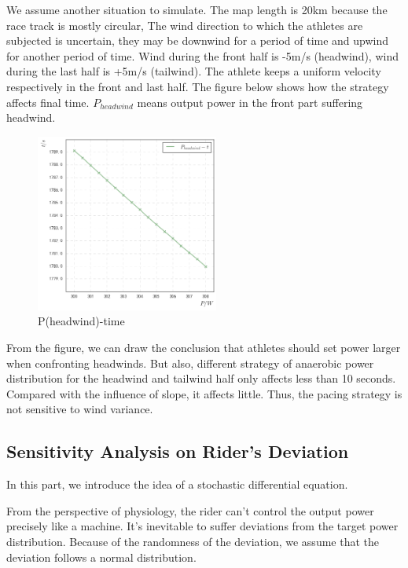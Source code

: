 \documentclass{mcmthesis}
\begin{document}
We assume another situation to simulate.
The map length is 20km because the race track is mostly circular, The wind direction to which the athletes are subjected is uncertain, they may be downwind for a period of time and upwind for another period of time. Wind during the front half is -5m/s (headwind), wind during the last half is +5m/s (tailwind). The athlete keeps a uniform velocity respectively in the front and last half. The figure below shows how the strategy affects final time. $P_{headwind}$ means output power in the front part suffering headwind.
\begin{figure}[H]
\small
\centering
\includegraphics[width=6cm]{mcmthesis/figures/p-t-headwind.png}
\caption{P(headwind)-time} 
\end{figure}
From the figure, we can draw the conclusion that athletes should set power larger when confronting headwinds. But also, different strategy of anaerobic power distribution for the headwind and tailwind half only affects less than 10 seconds. Compared with the influence of slope, it affects little. Thus, the pacing strategy is not sensitive to wind variance.


\subsection{Sensitivity Analysis on Rider's Deviation}
In this part, we introduce the idea of a stochastic differential equation.

From the perspective of physiology, the rider can't control the output power precisely like a machine. It's inevitable to suffer deviations from the target power distribution. Because of the randomness of the deviation, we assume that the deviation follows a normal distribution.
\end{document}
